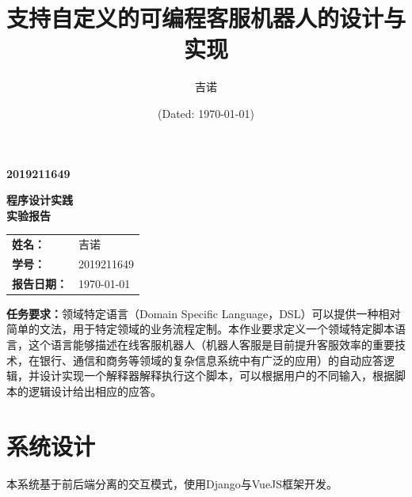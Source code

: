 \documentclass[hyperref]{ctexart}
\title{\textbf{支持自定义的可编程客服机器人的设计与实现}}
\author{\sffamily 2019211649 吉诺}
\date{(Dated: \today)}
\begin{document}
\begin{titlepage}
    \bfseries{2019211649}
    \vspace{4cm}
    \begin{center}
        \bfseries\huge{程序设计实践}\\
        \vspace{0.5cm}
        \bfseries\huge{实验报告}
        \vspace{3cm}
        \begin{center}
          \large
          \linespread{2}
          \centering
          \renewcommand\arraystretch{1.6}
          \begin{tabular}{p{3cm}P{6cm}}
            \bfseries{姓名：}           & 吉诺   \\ 
            \bfseries{学号：}           & 2019211649  \\ 
            \bfseries{报告日期：}        & \today \\ 
          \end{tabular}
        \end{center}
      \end{center}
\end{titlepage}
\tableofcontents
\maketitle
{\bf 任务要求：}领域特定语言（Domain Specific Language，DSL）可以提供一种相对简单的文法，用于特定领域的业务流程定制。本作业要求定义一个领域特定脚本语言，这个语言能够描述在线客服机器人（机器人客服是目前提升客服效率的重要技术，在银行、通信和商务等领域的复杂信息系统中有广泛的应用）的自动应答逻辑，并设计实现一个解释器解释执行这个脚本，可以根据用户的不同输入，根据脚本的逻辑设计给出相应的应答。
\section{系统设计}
本系统基于前后端分离的交互模式，使用Django与VueJS框架开发。
\end{document}
